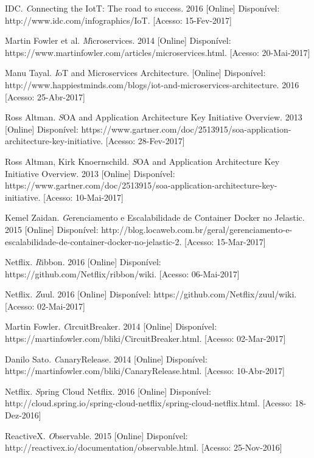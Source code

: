 \documentclass[journal]{IEEEtran}
\begin{document}
\begin{thebibliography}{1}
IDC. \emph Connecting the IotT: The road to success. 2016 [Online] Disponível: http://www.idc.com/infographics/IoT. [Acesso: 15-Fev-2017]

Martin Fowler et al. \emph Microservices. 2014 [Online] Disponível: https://www.martinfowler.com/articles/microservices.html. [Acesso: 20-Mai-2017]

Manu Tayal. \emph IoT and Microservices Architecture. [Online] Disponível: http://www.happiestminds.com/blogs/iot-and-microservices-architecture. 2016 [Acesso: 25-Abr-2017]

Ross Altman. \emph SOA and Application Architecture Key Initiative Overview. 2013 [Online] Disponível: https://www.gartner.com/doc/2513915/soa-application-architecture-key-initiative. [Acesso: 28-Fev-2017]

Ross Altman, Kirk Knoernschild. \emph SOA and Application Architecture Key Initiative Overview. 2013 [Online] Disponível: https://www.gartner.com/doc/2513915/soa-application-architecture-key-initiative. [Acesso: 10-Mai-2017]

Kemel Zaidan. \emph Gerenciamento e Escalabilidade de Container Docker no Jelastic. 2015 [Online] Disponível: http://blog.locaweb.com.br/geral/gerenciamento-e-escalabilidade-de-container-docker-no-jelastic-2. [Acesso: 15-Mar-2017]

Netflix. \emph Ribbon. 2016 [Online] Disponível: https://github.com/Netflix/ribbon/wiki. [Acesso: 06-Mai-2017]

Netflix. \emph Zuul. 2016 [Online] Disponível: https://github.com/Netflix/zuul/wiki. [Acesso: 02-Mai-2017]

Martin Fowler. \emph CircuitBreaker. 2014 [Online] Disponível: https://martinfowler.com/bliki/CircuitBreaker.html. [Acesso: 02-Mar-2017]

Danilo Sato. \emph CanaryRelease. 2014 [Online] Disponível: https://martinfowler.com/bliki/CanaryRelease.html. [Acesso: 10-Abr-2017]

Netflix. \emph Spring Cloud Netflix. 2016 [Online] Disponível: http://cloud.spring.io/spring-cloud-netflix/spring-cloud-netflix.html. [Acesso: 18-Dez-2016]

ReactiveX. \emph Observable. 2015 [Online] Disponível: http://reactivex.io/documentation/observable.html. [Acesso: 25-Nov-2016]


\end{thebibliography}
\end{document}
